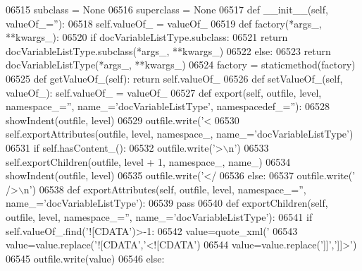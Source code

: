\begin{DoxyCode}
{{{{{{{{{{{{{{{{{{{{{{{{{{{{{{{{{{{{{{{{{{{{{{{{{{{{{{{{{{{{{{{{{{{{{{{{{{{{{{{{{{{{{{{{{{{{{{{{{{{{{{{{{{{{{{{{{{{{{{{{{{{{{{{{{{{{{{{{{{{{{{{{{{{{{{{{{{{{{{{{{{{{{{{{{{{{{{{{{{{{{{{{{{{{{{{{{{{{{{{{{{{{{{{{{{{{{{{{{{{{{{{{{{{{{{{{{{{{{{{{{{{{{{{{{{{{{{{{{{{{{{{{{{{{{{{{{{{{{{{{{{{{{{{{{{{{{{{{{{{{{{{{{{{{{{{{{{{{{{{{{{{{{{{{{{{{{{{{{{{{{{{{{{{{{{{{{{{{{{{{{{{{{{{{{{{{{{{{{{{{{{{{{{{{{{{{{{{{{{06515     subclass = \textcolor{keywordtype}{None}
06516     superclass = \textcolor{keywordtype}{None}
06517     \textcolor{keyword}{def }__init__(self, valueOf\_=''):
06518         self.valueOf_ = valueOf\_
06519     \textcolor{keyword}{def }factory(*args\_, **kwargs\_):
06520         \textcolor{keywordflow}{if} docVariableListType.subclass:
06521             \textcolor{keywordflow}{return} docVariableListType.subclass(*args\_, **kwargs\_)
06522         \textcolor{keywordflow}{else}:
06523             \textcolor{keywordflow}{return} docVariableListType(*args\_, **kwargs\_)
06524     factory = staticmethod(factory)
06525     \textcolor{keyword}{def }getValueOf_(self): \textcolor{keywordflow}{return} self.valueOf\_
06526     \textcolor{keyword}{def }setValueOf_(self, valueOf\_): self.valueOf\_ = valueOf\_
06527     \textcolor{keyword}{def }export(self, outfile, level, namespace\_='', name\_='docVariableListType', namespacedef\_=''):
06528         showIndent(outfile, level)
06529         outfile.write(\textcolor{stringliteral}{'<%
06530         self.exportAttributes(outfile, level, namespace\_, name\_=\textcolor{stringliteral}{'docVariableListType'})
06531         \textcolor{keywordflow}{if} self.hasContent_():
06532             outfile.write(\textcolor{stringliteral}{'>\(\backslash\)n'})
06533             self.exportChildren(outfile, level + 1, namespace\_, name\_)
06534             showIndent(outfile, level)
06535             outfile.write(\textcolor{stringliteral}{'</%
06536         \textcolor{keywordflow}{else}:
06537             outfile.write(\textcolor{stringliteral}{' />\(\backslash\)n'})
06538     \textcolor{keyword}{def }exportAttributes(self, outfile, level, namespace\_='', name\_='docVariableListType'):
06539         \textcolor{keywordflow}{pass}
06540     \textcolor{keyword}{def }exportChildren(self, outfile, level, namespace\_='', name\_='docVariableListType'):
06541         \textcolor{keywordflow}{if} self.valueOf\_.find(\textcolor{stringliteral}{'![CDATA'})>-1:
06542             value=quote_xml(\textcolor{stringliteral}{'%
06543             value=value.replace(\textcolor{stringliteral}{'![CDATA'},\textcolor{stringliteral}{'<![CDATA'})
06544             value=value.replace(\textcolor{stringliteral}{']]'},\textcolor{stringliteral}{']]>'})
06545             outfile.write(value)
06546         \textcolor{keywordflow}{else}:
}}}}}}}}}}}}}}}}}}}}}}}}}}}}}}}}}}}}}}}}}}}}}}}}}}}}}}}}}}}}}}}}}}}}}}}}}}}}}}}}}}}}}}}}}}}}}}}}}}}}}}}}}}}}}}}}}}}}}}}}}}}}}}}}}}}}}}}}}}}}}}}}}}}}}}}}}}}}}}}}}}}}}}}}}}}}}}}}}}}}}}}}}}}}}}}}}}}}}}}}}}}}}}}}}}}}}}}}}}}}}}}}}}}}}}}}}}}}}}}}}}}}}}}}}}}}}}}}}}}}}}}}}}}}}}}}}}}}}}}}}}}}}}}}}}}}}}}}}}}}}}}}}}}}}}}}}}}}}}}}}}}}}}}}}}}}}}}}}}}}}}}}}}}}}}}}}}}}}}}}}}}}}}}}}}}}}}}}}}}}}}}}}}}}}}}}}}}}}}}}}
\end{DoxyCode}
